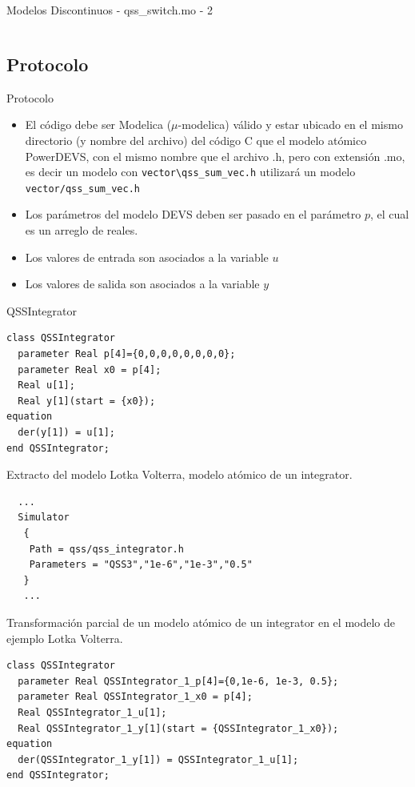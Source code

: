 \documentclass{beamer}
\begin{document}
\begin{frame}[fragile]{Modelos Discontinuos - qss\_switch.mo - 2}
        \inputminted[linenos,firstline=9]{modelica}{../../data/qss/qss_switch.mo}
\end{frame}


\subsection{Protocolo}
\begin{frame}[fragile]{Protocolo}
\begin{itemize}
        \item<1-> El código debe ser Modelica ($\mu$-modelica) válido y estar ubicado en el mismo directorio (y nombre del archivo) del código C que el modelo atómico 
        PowerDEVS, con el mismo nombre que el archivo .h, pero con extensión .mo, es decir un modelo con \texttt{vector\textbackslash qss\_sum\_vec.h} 
	utilizará un modelo \texttt{vector/qss\_sum\_vec.h} 
        \item<2-> Los parámetros del modelo DEVS deben ser pasado en el parámetro $p$, el cual es un arreglo de reales. 
        \item<3-> Los valores de entrada son asociados a la variable $u$
        \item<4-> Los valores de salida son asociados a la variable $y$
\end{itemize}
\end{frame}

\begin{frame}[fragile]{QSSIntegrator}
\begin{verbatim}
class QSSIntegrator
  parameter Real p[4]={0,0,0,0,0,0,0,0};
  parameter Real x0 = p[4];
  Real u[1];
  Real y[1](start = {x0});
equation
  der(y[1]) = u[1];
end QSSIntegrator;
\end{verbatim}
\end{frame}

\begin{frame}[fragile]{Extracto del modelo Lotka Volterra, modelo atómico de un integrator.}
\begin{verbatim}
  ...
  Simulator
   {
    Path = qss/qss_integrator.h
    Parameters = "QSS3","1e-6","1e-3","0.5"
   }
   ...
\end{verbatim}
\end{frame}

\begin{frame}[fragile]{Transformación parcial de un modelo atómico de un integrator en el modelo de ejemplo Lotka Volterra.}
\begin{verbatim}
class QSSIntegrator
  parameter Real QSSIntegrator_1_p[4]={0,1e-6, 1e-3, 0.5};
  parameter Real QSSIntegrator_1_x0 = p[4];
  Real QSSIntegrator_1_u[1];
  Real QSSIntegrator_1_y[1](start = {QSSIntegrator_1_x0});
equation
  der(QSSIntegrator_1_y[1]) = QSSIntegrator_1_u[1];
end QSSIntegrator;
\end{verbatim}
\end{frame}
\end{document}
